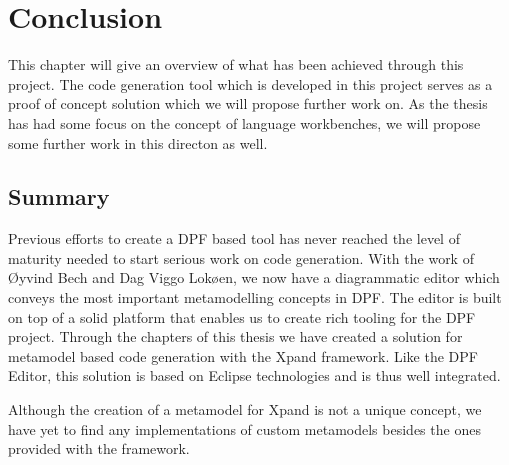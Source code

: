 \chapter{Conclusion}\label{chap:conclusion}
This chapter will give an overview of what has been achieved through this project. The code generation tool which is developed in this project serves as a proof of concept solution which we will propose further work on. As the thesis has had some focus on the concept of language workbenches, we will propose some further work in this directon as well.

\section{Summary}
Previous efforts to create a DPF based tool has never reached the level of maturity needed to start serious work on code generation. With the work of Øyvind Bech and Dag Viggo Lokøen, we now have a diagrammatic editor which conveys the most important metamodelling concepts in DPF. The editor is built on top of a solid platform that enables us to create rich tooling for the DPF project. Through the chapters of this thesis we have created a solution for metamodel based code generation with the Xpand framework. Like the DPF Editor, this solution is based on Eclipse technologies and is thus well integrated.

Although the creation of a metamodel for Xpand is not a unique concept, we have yet to find any implementations of custom metamodels besides the ones provided with the framework.

